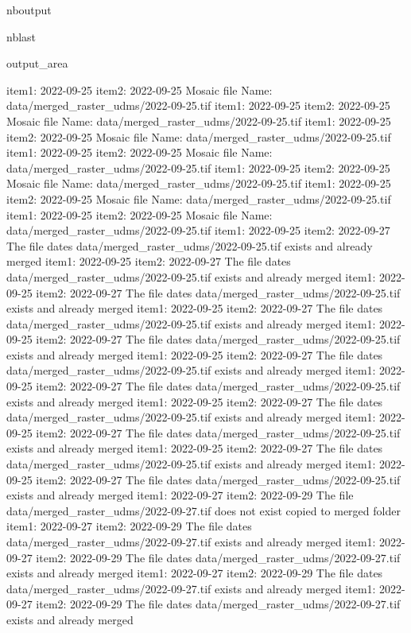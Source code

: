 \documentclass[letterpaper,10pt]{sphinxmanual}
\begin{document}
\begin{sphinxuseclass}{nboutput}
\begin{sphinxuseclass}{nblast}
{\begin{sphinxuseclass}{output_area}
\begin{sphinxuseclass}{}
\begin{sphinxVerbatim}[commandchars=\\\{\}]
item1:  2022-09-25
item2:  2022-09-25
Mosaic file Name:  data/merged\_raster\_udms/2022-09-25.tif
item1:  2022-09-25
item2:  2022-09-25
Mosaic file Name:  data/merged\_raster\_udms/2022-09-25.tif
item1:  2022-09-25
item2:  2022-09-25
Mosaic file Name:  data/merged\_raster\_udms/2022-09-25.tif
item1:  2022-09-25
item2:  2022-09-25
Mosaic file Name:  data/merged\_raster\_udms/2022-09-25.tif
item1:  2022-09-25
item2:  2022-09-25
Mosaic file Name:  data/merged\_raster\_udms/2022-09-25.tif
item1:  2022-09-25
item2:  2022-09-25
Mosaic file Name:  data/merged\_raster\_udms/2022-09-25.tif
item1:  2022-09-25
item2:  2022-09-25
Mosaic file Name:  data/merged\_raster\_udms/2022-09-25.tif
item1:  2022-09-25
item2:  2022-09-27
The file dates data/merged\_raster\_udms/2022-09-25.tif exists and already merged
item1:  2022-09-25
item2:  2022-09-27
The file dates data/merged\_raster\_udms/2022-09-25.tif exists and already merged
item1:  2022-09-25
item2:  2022-09-27
The file dates data/merged\_raster\_udms/2022-09-25.tif exists and already merged
item1:  2022-09-25
item2:  2022-09-27
The file dates data/merged\_raster\_udms/2022-09-25.tif exists and already merged
item1:  2022-09-25
item2:  2022-09-27
The file dates data/merged\_raster\_udms/2022-09-25.tif exists and already merged
item1:  2022-09-25
item2:  2022-09-27
The file dates data/merged\_raster\_udms/2022-09-25.tif exists and already merged
item1:  2022-09-25
item2:  2022-09-27
The file dates data/merged\_raster\_udms/2022-09-25.tif exists and already merged
item1:  2022-09-25
item2:  2022-09-27
The file dates data/merged\_raster\_udms/2022-09-25.tif exists and already merged
item1:  2022-09-25
item2:  2022-09-27
The file dates data/merged\_raster\_udms/2022-09-25.tif exists and already merged
item1:  2022-09-25
item2:  2022-09-27
The file dates data/merged\_raster\_udms/2022-09-25.tif exists and already merged
item1:  2022-09-25
item2:  2022-09-27
The file dates data/merged\_raster\_udms/2022-09-25.tif exists and already merged
item1:  2022-09-27
item2:  2022-09-29
The file data/merged\_raster\_udms/2022-09-27.tif does not exist copied to merged folder
item1:  2022-09-27
item2:  2022-09-29
The file dates data/merged\_raster\_udms/2022-09-27.tif exists and already merged
item1:  2022-09-27
item2:  2022-09-29
The file dates data/merged\_raster\_udms/2022-09-27.tif exists and already merged
item1:  2022-09-27
item2:  2022-09-29
The file dates data/merged\_raster\_udms/2022-09-27.tif exists and already merged
item1:  2022-09-27
item2:  2022-09-29
The file dates data/merged\_raster\_udms/2022-09-27.tif exists and already merged

\end{sphinxVerbatim}
\end{sphinxuseclass}
\end{sphinxuseclass}}
\end{sphinxuseclass}
\end{sphinxuseclass}
\end{document}
